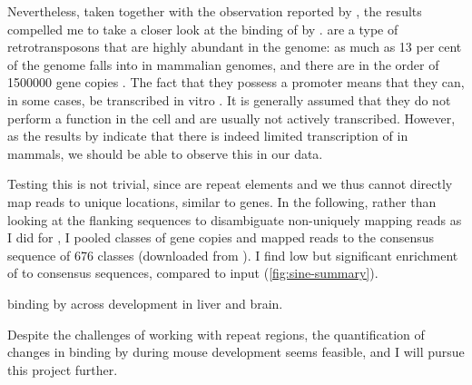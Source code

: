 Nevertheless, taken together with the observation reported by
\citet{Carriere:2012}, the results compelled me to take a closer look at the
binding of \transsine by . \transsine are a type of retrotransposons that
are highly abundant in the genome: as much as \num{13} per cent of the genome
falls into \transsine[s] in mammalian genomes, and there are in the order of
\num{1500000} gene copies \citep{Lander:2001}. The fact that they possess a
 promoter means that they can, in some cases, be transcribed in vitro
\citep{White:1998}. It is generally assumed that they do not perform a function
in the cell and are usually not actively transcribed. However, as the results by
\citet{Carriere:2012} indicate that there is indeed limited transcription of
\transsine in mammals, we should be able to observe this in our  \chip
data.

Testing this is not trivial, since \transsine[s] are repeat elements and we thus
cannot directly map reads to unique locations, similar to \trna genes. In the
following, rather than looking at the flanking sequences to disambiguate
non-uniquely mapping reads as I did for \trna, I pooled classes of \transsine
gene copies and mapped  \chipseq reads to the consensus sequence of
\num{676} classes (downloaded from  \citep{Jurka:2005}). I find
low but significant enrichment of  to \transsine consensus sequences,
compared to input (\cref{fig:sine-summary}).

{ binding by  across development in liver and brain.}{}

Despite the challenges of working with repeat regions, the quantification of
changes in \transsine binding by  during mouse development seems feasible,
and I will pursue this project further.
